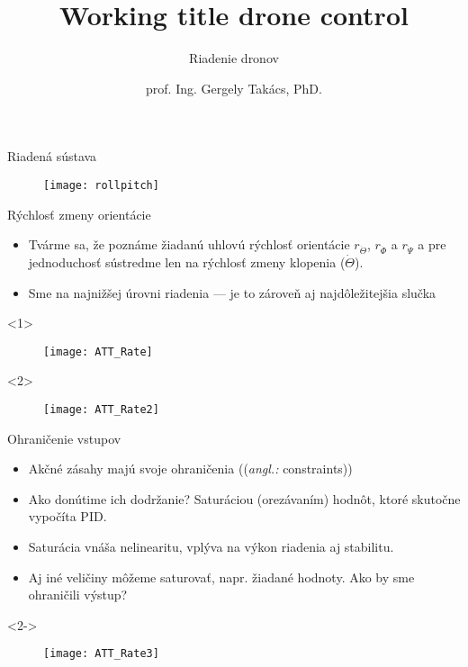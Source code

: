 \documentclass{beamer}
\title[Riadiace Algoritmy Dronov]
{Working title drone control}
\subtitle{\vspace{1em}Riadenie dronov}
\author[]{prof. Ing. Gergely Takács, PhD.}
\date[07.12.2021]{}
\newcommand{\angl}[1]{{\color{gray}(\emph{angl.:} #1)}}
\begin{document}



%

\begin{frame}{Riadená sústava}
\begin{figure}
\centering
  \texttt{[image: rollpitch]}\\
\end{figure}
\end{frame}


\begin{frame}[t]{Rýchlosť zmeny orientácie}
\begin{itemize}
  \item<1-> Tvárme sa, že poznáme žiadanú uhlovú rýchlosť orientácie $r_{\dot{\Theta}}$, $r_{\dot{\Phi}}$ a $r_{\dot{\Psi}}$ a pre jednoduchosť sústredme len na rýchlosť zmeny klopenia ($\dot{\Theta}$).
  \item<2-> Sme na najnižšej úrovni riadenia --- je to zároveň aj najdôležitejšia slučka \citep{AP:PID}
  \end{itemize}
  
  \begin{onlyenv}<1>
  \begin{figure}
\centering
  \texttt{[image: ATT\_Rate]}\\
\end{figure}
\end{onlyenv}

  \begin{onlyenv}<2>
  \begin{figure}
\centering
  \texttt{[image: ATT\_Rate2]}\\
\end{figure}
\end{onlyenv}

  \end{frame}

\begin{frame}[t]{Ohraničenie vstupov}
  \begin{itemize}
    \item<1-> Akčné zásahy majú svoje ohraničenia (\angl{constraints})
    \item<2-> Ako donútime ich dodržanie? Saturáciou (orezávaním) hodnôt, ktoré skutočne vypočíta PID.
    \item<3-> Saturácia vnáša nelinearitu, vplýva na výkon riadenia aj stabilitu.
    \item<4-> Aj iné veličiny môžeme saturovať, napr. žiadané hodnoty. Ako by sme ohraničili výstup?
  \end{itemize}
  
    \begin{onlyenv}<2->
  \begin{figure}
\centering
  \texttt{[image: ATT\_Rate3]}\\
\end{figure}
\end{onlyenv}
\end{frame}
\end{document}
